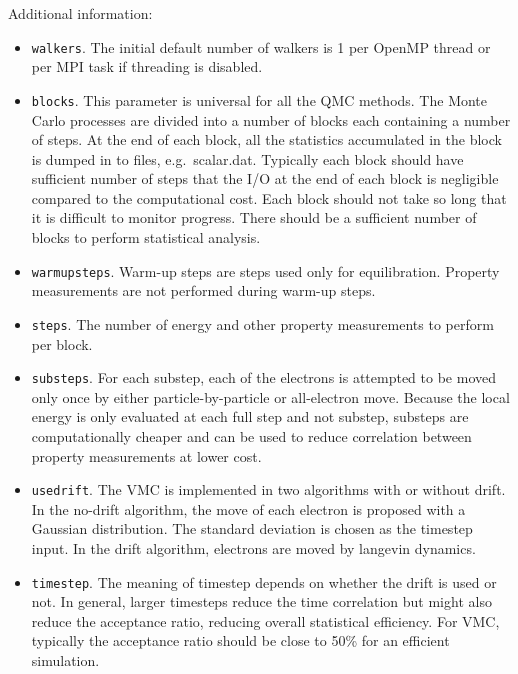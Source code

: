 Additional information:
\begin{itemize}
\item \texttt{walkers}. The initial default number of walkers is 1 per OpenMP thread or per MPI task if threading is disabled.

\item \texttt{blocks}. This parameter is universal for all the QMC
  methods. The Monte Carlo processes are divided into a number of
  blocks each containing a number of steps. At the end of each block,
  all the statistics accumulated in the block is dumped in to files,
  e.g.\ scalar.dat. Typically each block should have sufficient number
  of steps that the I/O at the end of each block is negligible
  compared to the computational cost. Each block should not take so
  long that it is difficult to monitor progress. There should be a
  sufficient number of blocks to perform statistical analysis.

\item \texttt{warmupsteps}. Warm-up steps are steps used only for
  equilibration. Property measurements are not performed during
  warm-up steps.

\item \texttt{steps}. The number of energy and other property measurements to perform per block.
  
\item \texttt{substeps}. For each substep, each of the electrons is
  attempted to be moved only once by either particle-by-particle or
  all-electron move.  Because the local energy is only evaluated at
  each full step and not substep, substeps are computationally cheaper
  and can be used to reduce correlation between property measurements
  at lower cost.
  
\item \texttt{usedrift}. The VMC is implemented in two algorithms with
  or without drift. In the no-drift algorithm, the move of each
  electron is proposed with a Gaussian distribution. The standard
  deviation is chosen as the timestep input. In the drift algorithm,
  electrons are moved by langevin dynamics.

\item \texttt{timestep}. The meaning of timestep depends on whether
  the drift is used or not. In general, larger timesteps reduce the
  time correlation but might also reduce the acceptance ratio,
  reducing overall statistical efficiency. For VMC, typically the
  acceptance ratio should be close to 50\% for an efficient
  simulation.


\end{itemize}
